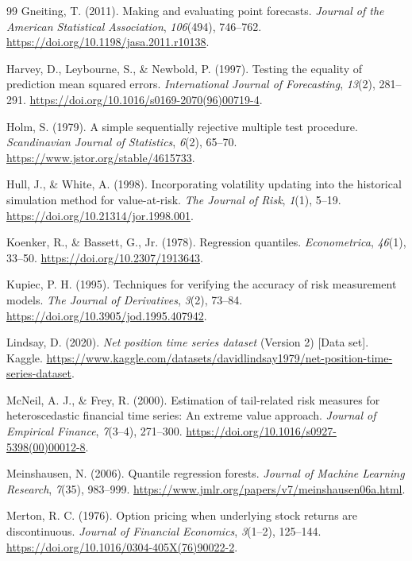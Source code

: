 \documentclass[11pt,a4paper]{article}
\begin{document}
\begin{thebibliography}{99}
 Gneiting, T. (2011). Making and evaluating point forecasts. \emph{Journal of the American Statistical Association}, \emph{106}(494), 746--762. \url{https://doi.org/10.1198/jasa.2011.r10138}.

 Harvey, D., Leybourne, S., \& Newbold, P. (1997). Testing the equality of prediction mean squared errors. \emph{International Journal of Forecasting}, \emph{13}(2), 281--291. \url{https://doi.org/10.1016/s0169-2070(96)00719-4}.

 Holm, S. (1979). A simple sequentially rejective multiple test procedure. \emph{Scandinavian Journal of Statistics}, \emph{6}(2), 65--70. \url{https://www.jstor.org/stable/4615733}.

 Hull, J., \& White, A. (1998). Incorporating volatility updating into the historical simulation method for value-at-risk. \emph{The Journal of Risk}, \emph{1}(1), 5--19. \url{https://doi.org/10.21314/jor.1998.001}.

 Koenker, R., \& Bassett, G., Jr. (1978). Regression quantiles. \emph{Econometrica}, \emph{46}(1), 33--50. \url{https://doi.org/10.2307/1913643}.

 Kupiec, P. H. (1995). Techniques for verifying the accuracy of risk measurement models. \emph{The Journal of Derivatives}, \emph{3}(2), 73--84. \url{https://doi.org/10.3905/jod.1995.407942}.

 Lindsay, D. (2020). \emph{Net position time series dataset} (Version 2) [Data set]. Kaggle. \url{https://www.kaggle.com/datasets/davidlindsay1979/net-position-time-series-dataset}.

 McNeil, A. J., \& Frey, R. (2000). Estimation of tail-related risk measures for heteroscedastic financial time series: An extreme value approach. \emph{Journal of Empirical Finance}, \emph{7}(3--4), 271--300. \url{https://doi.org/10.1016/s0927-5398(00)00012-8}.

 Meinshausen, N. (2006). Quantile regression forests. \emph{Journal of Machine Learning Research}, \emph{7}(35), 983--999. \url{https://www.jmlr.org/papers/v7/meinshausen06a.html}.

 Merton, R. C. (1976). Option pricing when underlying stock returns are discontinuous. \emph{Journal of Financial Economics}, \emph{3}(1--2), 125--144. \url{https://doi.org/10.1016/0304-405X(76)90022-2}.


\end{thebibliography}
\end{document}
